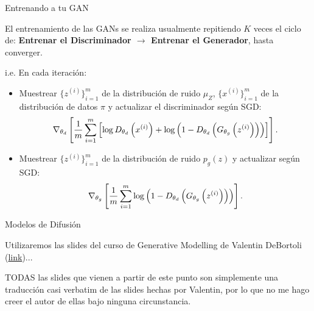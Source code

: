 \documentclass[aspectratio=169,xcolor=dvipsnames, t, spanish]{beamer}
\begin{document}
\begin{frame}{Entrenando a tu GAN}\vspace{-6mm}
\begin{center}
    El entrenamiento de las GANs se realiza usualmente repitiendo $K$ veces el ciclo de: \textbf{Entrenar el Discriminador $\rightarrow$ Entrenar el Generador}, hasta converger.
\end{center}
\pause

    i.e. En cada iteración:
    \begin{itemize}
        \item Muestrear $\{z^{(i)}\}_{i=1}^m$ de la distribución de ruido $\mu_Z$, $\{x^{(i)}\}_{i=1}^m$ de la distribución de datos $\pi$ y actualizar el discriminador según SGD:\vspace{-1mm}
            \[
                \nabla_{\theta_d} \left[ \frac{1}{m} \sum_{i=1}^m \left[ \log D_{\theta_d}\left(x^{(i)}\right) + \log \left(1 - D_{\theta_d}\left(G_{\theta_g}\left(z^{(i)}\right)\right)\right) \right] \right].\vspace{-1mm}
            \]
        \pause
        \item Muestrear $\{z^{(i)}\}_{i=1}^m$ de la distribución de ruido $p_g(z)$ y actualizar según SGD:\vspace{-1mm}
        \[
            \nabla_{\theta_g} \left[\frac{1}{m} \sum_{i=1}^m \log \left(1 - D_{\theta_d}\left(G_{\theta_g}\left(z^{(i)}\right)\right)\right)\right].\vspace{-1mm}
        \]
    \end{itemize}
\end{frame}



\begin{frame}{Modelos de Difusión}

    \begin{center}
        Utilizaremos las slides del curso de Generative Modelling de Valentin DeBortoli (\href{https://vdeborto.github.io/project/generative_modeling/}{link})... 

        \pause
        TODAS las slides que vienen a partir de este punto son simplemente una traducción casi verbatim de las slides hechas por Valentin, por lo que no me hago creer el autor de ellas bajo ninguna circunstancia.
    \end{center}
    
\end{frame}
\end{document}
